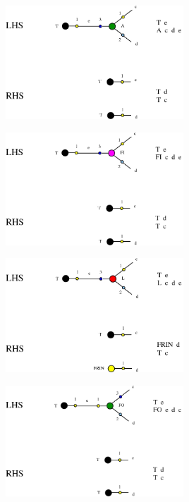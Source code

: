 \documentclass{article}
\begin{document}
\centerline{\includegraphics[width=0.5\textwidth]{../img/term-A-T.jpg}
}
\vspace{.5cm}



\vspace{.5cm}
 
\centerline{\includegraphics[width=0.5\textwidth]{../img/term-FI-T.jpg}
}
\vspace{.5cm}

\centerline{\includegraphics[width=0.5\textwidth]{../img/termL-L-T.jpg}
}
\vspace{.5cm}

\vspace{.5cm}
 
\centerline{\includegraphics[width=0.5\textwidth]{../img/termin2-T-FO.jpg}
}
\vspace{.5cm}
\end{document}
